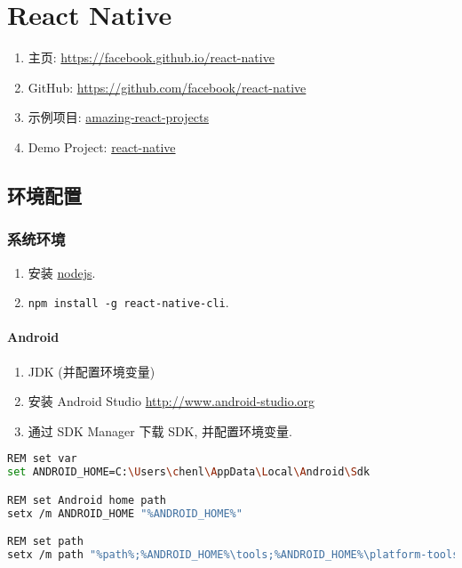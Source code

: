 \section{React Native}\label{react-native}

\begin{enumerate}
\def\labelenumi{\arabic{enumi}.}
\tightlist
\item
  主页: \url{https://facebook.github.io/react-native}
\item
  GitHub: \url{https://github.com/facebook/react-native}
\item
  示例项目:
  \href{https://github.com/jiwonbest/amazing-react-projects}{amazing-react-projects}
\item
  Demo Project:
  \href{https://github.com/HereChen/template/tree/master/react-native}{react-native}
\end{enumerate}

\subsection{环境配置}\label{ux73afux5883ux914dux7f6e}

\subsubsection{系统环境}\label{ux7cfbux7edfux73afux5883}

\begin{enumerate}
\def\labelenumi{\arabic{enumi}.}
\tightlist
\item
  安装 \href{https://nodejs.org}{nodejs}.
\item
  \lstinline!npm install -g react-native-cli!.
\end{enumerate}

\paragraph{Android}\label{android}

\begin{enumerate}
\def\labelenumi{\arabic{enumi}.}
\tightlist
\item
  JDK (并配置环境变量)
\item
  安装 Android Studio \url{http://www.android-studio.org}
\item
  通过 SDK Manager 下载 SDK, 并配置环境变量.
\end{enumerate}

\begin{lstlisting}[language=bash]
REM set var
set ANDROID_HOME=C:\Users\chenl\AppData\Local\Android\Sdk

REM set Android home path
setx /m ANDROID_HOME "%ANDROID_HOME%"

REM set path
setx /m path "%path%;%ANDROID_HOME%\tools;%ANDROID_HOME%\platform-tools;"
\end{lstlisting}

